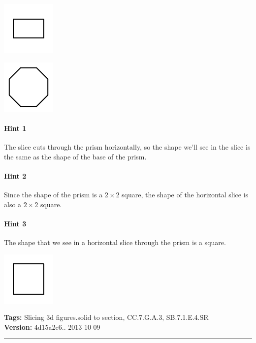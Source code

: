 \documentclass[twocolumn,10pt]{article}
\def\shrinkfactor{0.4}
\begin{document}
\includegraphics[scale=\shrinkfactor]{figures/0e5042b475e0847d67b74c0482f8e8173f798656.png}


\includegraphics[scale=\shrinkfactor]{figures/7d98a99c75a84da8f748444ad7a3a8053be16a27.png}



\paragraph{Hint 1}The slice cuts through the prism horizontally, so the shape we'll see in the slice is the same as the shape of the base of the prism.

\paragraph{Hint 2}Since the shape of the prism is a $2 \times 2$ square, the shape of the horizontal slice is also a $2 \times 2$ square.

\paragraph{Hint 3}The shape that we see in a horizontal slice through the prism is a square.  

\includegraphics[scale=\shrinkfactor]{figures/4b59a0ece6acc7c19c389e1de534d1df93bf1169.png}



\medskip
\noindent
\textbf{Tags:} {\footnotesize Slicing 3d figures.solid to section, CC.7.G.A.3, SB.7.1.E.4.SR}\\
\textbf{Version:} 4d15a2c6.. 2013-10-09
\smallskip\hrule
\end{document}
